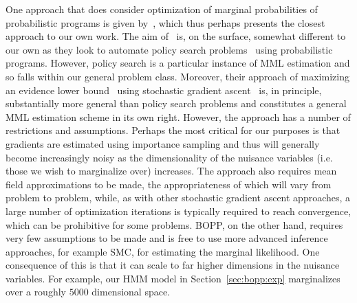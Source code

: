 One approach that does consider optimization of marginal probabilities of probabilistic
programs is given by~\cite{vandemeent2016black}, which thus perhaps presents the closest
approach to our own work.  The aim of~\cite{vandemeent2016black} is, on the surface, somewhat
different to our own as they look to automate policy search problems~\citep{deisenroth2013survey}
using probabilistic programs.  However, policy search is a particular instance of MML estimation
and so falls within our general problem class.  Moreover, their approach of maximizing an evidence lower bound~\citep{blei2016variational}
using stochastic gradient ascent~\citep{robbins1951stochastic} is, in principle, substantially
more general than policy search problems and constitutes a general MML estimation scheme in its own right.
However, the approach has a number of restrictions and assumptions.  
Perhaps the most critical for our purposes is that gradients are estimated using
importance sampling and thus will generally become increasingly noisy as the dimensionality of the nuisance variables (i.e. those we wish to marginalize over) increases.
The approach also requires mean field approximations
to be made, the appropriateness of which will vary from problem to problem, while, as with other
stochastic gradient ascent approaches, a large number of optimization iterations is typically required
to reach convergence, which can be prohibitive for some problems.  BOPP, on the other hand, requires
very few assumptions to be made and is free to use more advanced inference approaches, for example
SMC, for estimating the marginal likelihood.  One consequence of this is that it can scale to far
higher dimensions in the nuisance variables.  For example, our HMM model in Section~\ref{sec:bopp:exp}
marginalizes over a roughly $5000$ dimensional space.

